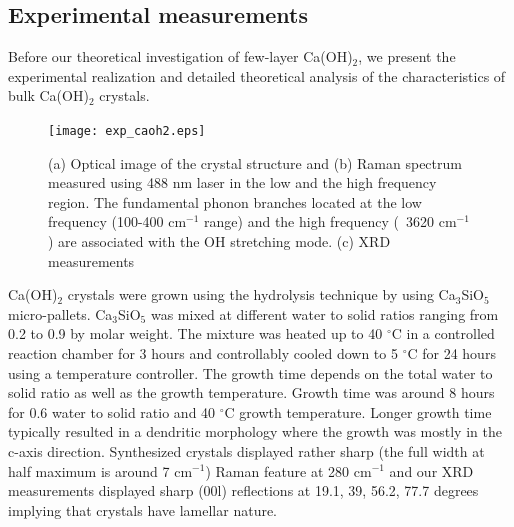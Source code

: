 \subsection{Experimental measurements}


Before our theoretical investigation of few-layer Ca(OH)$_{2}$, we 
present the experimental realization and detailed theoretical analysis of the
characteristics of bulk Ca(OH)$_{2}$ crystals.


\begin{figure}[htb]
\centering
\texttt{[image: exp\_caoh2.eps]}
\caption{\label{fig:exp_caoh2} (a) Optical image of the crystal structure and (b) Raman 
spectrum measured using 488 nm laser in the low and the high frequency region. 
The fundamental phonon branches located at the low frequency (100-400 cm$^{-1}$  range) and the high frequency (~3620 cm$^{-1}$) are associated with the OH  stretching mode. (c) XRD measurements}
\end{figure}

Ca(OH)$_{2}$ crystals were grown using the hydrolysis technique by using 
Ca$_{3}$SiO$_{5}$ micro-pallets. Ca$_{3}$SiO$_{5}$ was mixed at different water 
to solid ratios ranging from 0.2 to 0.9 by molar weight. The mixture was heated 
up to 40 $^{\circ}\mathrm{C}$ in a controlled reaction chamber for 3 hours and 
controllably cooled down to 5 $^{\circ}\mathrm{C}$ for 24 hours using a
temperature controller. The growth time depends on the total water to solid 
ratio as well as the growth temperature. Growth time was around 8 hours for 0.6 
water to solid ratio and 40 $^{\circ}\mathrm{C}$ growth temperature. 
Longer growth time typically resulted in a dendritic morphology where the 
growth was mostly in the c-axis direction. Synthesized crystals displayed rather sharp (the full width at half maximum is around 7 cm$^{-1}$) Raman feature at 280 cm$^{-1}$ and our XRD measurements displayed sharp (00l) reflections at 19.1, 39, 56.2, 77.7 degrees implying that crystals have lamellar nature.  
 

